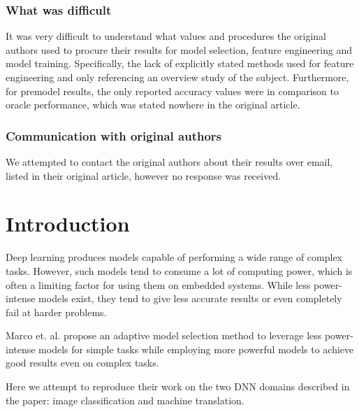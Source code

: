 \subsubsection{What was difficult}
It was very difficult to understand what values and procedures the original authors used to procure their results for model selection, feature engineering and model training. Specifically, the lack of explicitly stated methods used for feature engineering and only referencing an overview study of the subject. Furthermore, for premodel results, the only reported accuracy values were in comparison to oracle performance, which was stated nowhere in the original article.

\subsubsection{Communication with original authors}
We attempted to contact the original authors about their results over email, listed in their original article, however no response was received.



\section{Introduction}
Deep learning produces models capable of performing a wide range of complex tasks. However, such models tend to consume a lot of computing power, which is often a limiting factor for using them on embedded systems. While less power-intense models exist, they tend to give less accurate results or even completely fail at harder problems.

Marco et. al. \cite{marco2019optimizing} propose an adaptive model selection method to leverage less power-intense models for simple tasks while employing more powerful models to achieve good results even on complex tasks.

Here we attempt to reproduce their work on the two DNN domains described in the paper: image classification and machine translation.

